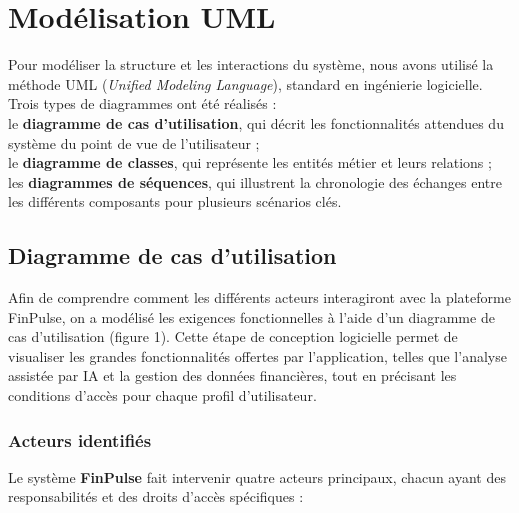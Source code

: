 \section{Modélisation UML}
Pour modéliser la structure et les interactions du système, nous avons utilisé la méthode UML (\textit{Unified Modeling Language}), standard en ingénierie logicielle. \vspace{3mm}  \\Trois types de diagrammes ont été réalisés :\vspace{3mm}\\le \textbf{diagramme de cas d’utilisation}, qui décrit les fonctionnalités attendues du système du point de vue de l’utilisateur ; \\le \textbf{diagramme de classes}, qui représente les entités métier et leurs relations ; \\ les \textbf{diagrammes de séquences}, qui illustrent la chronologie des échanges entre les différents composants pour plusieurs scénarios clés.
\subsection{Diagramme de cas d'utilisation}
Afin de comprendre comment les différents acteurs interagiront avec la plateforme FinPulse, on a modélisé les exigences fonctionnelles à l'aide d'un diagramme de cas d'utilisation (figure 1). Cette étape de conception logicielle permet de visualiser les grandes fonctionnalités offertes par l'application, telles que l'analyse assistée par IA et la gestion des données financières, tout en précisant les conditions d'accès pour chaque profil d'utilisateur.
\subsubsection{Acteurs identifiés}
Le système \textbf{FinPulse} fait intervenir quatre acteurs principaux, chacun ayant des responsabilités et des droits d'accès spécifiques :

